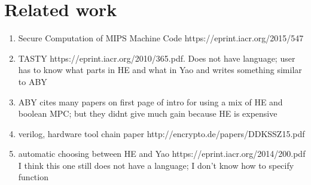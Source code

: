 \section{Related work}
\label{sec:related}

\begin{enumerate}
\item Secure Computation of MIPS Machine Code https://eprint.iacr.org/2015/547
\item TASTY https://eprint.iacr.org/2010/365.pdf. Does not have language; user has to know what parts in HE and what in Yao and writes something similar to ABY
\item ABY cites many papers on first page of intro for using a mix of HE and boolean MPC; but they didnt give much gain because HE is expensive
\item verilog, hardware tool chain paper http://encrypto.de/papers/DDKSSZ15.pdf
\item automatic choosing between HE and Yao https://eprint.iacr.org/2014/200.pdf 
I think this one still does not have a language; I don't know how to specify function
 

\end{enumerate}